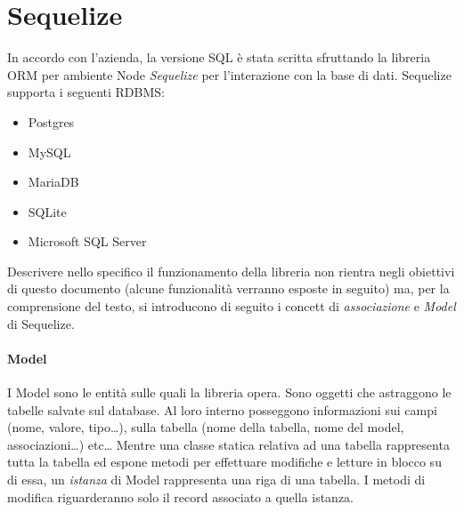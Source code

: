 \documentclass[a4paper, 12pt]{report}
\begin{document}
    \section{Sequelize}
      In accordo con l'azienda, la versione SQL è stata scritta sfruttando la libreria ORM per ambiente Node \emph{Sequelize} per l'interazione con la base di dati.
      Sequelize supporta i seguenti RDBMS:
      \begin{itemize}
        \item Postgres
        \item MySQL
        \item MariaDB
        \item SQLite
        \item Microsoft SQL Server
      \end{itemize}
      Descrivere nello specifico il funzionamento della libreria non rientra negli obiettivi di questo documento (alcune funzionalità verranno esposte in seguito) ma, per la comprensione del testo, si introducono di seguito i concett di \emph{associazione}  e \emph{Model} di Sequelize.
      \paragraph*{Model} 
      I Model sono le entità sulle quali la libreria opera. Sono oggetti che astraggono le tabelle salvate sul database.
      Al loro interno posseggono informazioni sui campi (nome, valore, tipo\dots), sulla tabella (nome della tabella, nome del model, associazioni\dots) etc\dots
      Mentre una classe statica relativa ad una tabella rappresenta tutta la tabella ed espone metodi per effettuare modifiche e letture in blocco su di essa, un \emph{istanza} di Model rappresenta una riga di una tabella.
      I metodi di modifica riguarderanno solo il record associato a quella istanza.
\end{document}
